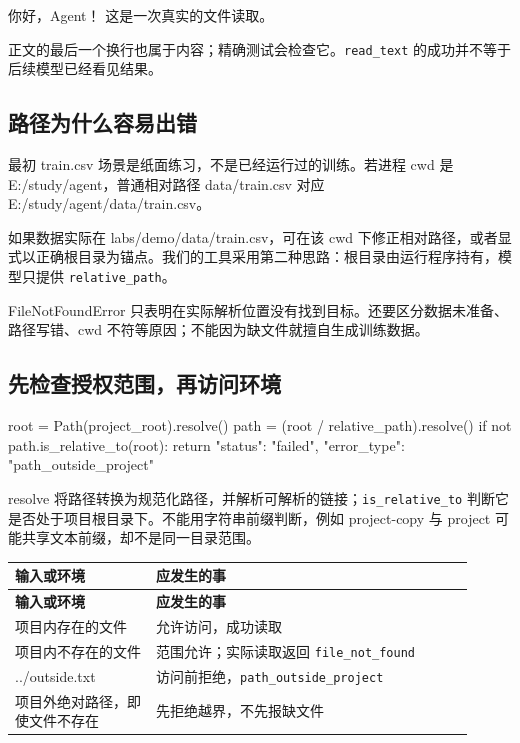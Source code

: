 \documentclass[UTF8,zihao=-4,fontset=fandol]{ctexart}
\begin{document}
\begin{Code}
你好，Agent！
这是一次真实的文件读取。
\end{Code}

正文的最后一个换行也属于内容；精确测试会检查它。\nolinkurl{read_text} 的成功并不等于后续模型已经看见结果。

\subsection{路径为什么容易出错}

最初 train.csv 场景是纸面练习，不是已经运行过的训练。若进程 cwd 是 E:/study/agent，普通相对路径 data/train.csv 对应 E:/study/agent/data/train.csv。

如果数据实际在 labs/demo/data/train.csv，可在该 cwd 下修正相对路径，或者显式以正确根目录为锚点。我们的工具采用第二种思路：根目录由运行程序持有，模型只提供 \nolinkurl{relative_path}。

FileNotFoundError 只表明在实际解析位置没有找到目标。还要区分数据未准备、路径写错、cwd 不符等原因；不能因为缺文件就擅自生成训练数据。

\subsection{先检查授权范围，再访问环境}

\begin{Code}
root = Path(project_root).resolve()
path = (root / relative_path).resolve()
if not path.is_relative_to(root):
    return {"status": "failed", "error_type": "path_outside_project"}
\end{Code}

resolve 将路径转换为规范化路径，并解析可解析的链接；\nolinkurl{is_relative_to} 判断它是否处于项目根目录下。不能用字符串前缀判断，例如 project-copy 与 project 可能共享文本前缀，却不是同一目录范围。

{\small\setlength{\tabcolsep}{4pt}
\renewcommand{\arraystretch}{1.25}
\begin{longtable}{>{\raggedright\arraybackslash}p{0.28\linewidth}>{\raggedright\arraybackslash}p{0.63\linewidth}}
\toprule
\textbf{输入或环境} & \textbf{应发生的事} \\
\midrule\endfirsthead
\toprule
\textbf{输入或环境} & \textbf{应发生的事} \\
\midrule\endhead
\bottomrule\endfoot
项目内存在的文件 & 允许访问，成功读取 \\
项目内不存在的文件 & 范围允许；实际读取返回 \nolinkurl{file_not_found} \\
../outside.txt & 访问前拒绝，\nolinkurl{path_outside_project} \\
项目外绝对路径，即使文件不存在 & 先拒绝越界，不先报缺文件 \\
\end{longtable}}
\end{document}
